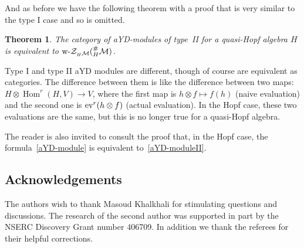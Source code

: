 \documentclass[pdftex]{sigma}
\newcommand{\Zc}{\mathcal{Z}}
\newcommand{\hmod}{{_H\mathcal{M}}}
\newcommand{\hhash}{{^{\#}_H \mathcal{M}}}
\numberwithin{equation}{section}
\newtheorem{Theorem}{Theorem}[section]
\begin{document}
 And as before we have the following theorem with a proof that is very similar to the type I case and so is omitted.

\begin{Theorem}The category of aYD-modules of type~II for a quasi-Hopf algebra $H$ is equivalent to $\text{\rm w-}\Zc_\hmod(\hhash)$.
 \end{Theorem}

\begin{Remark}Type I and type II aYD modules are different, though of course are equivalent as categories. The difference between them is like the difference between two maps: $H \otimes \operatorname{Hom}^r(H,V) \rightarrow V $, where the first map is $ h \otimes f \mapsto f(h)$ (naive evaluation) and the second one is $\text{\rm ev}^r(h\otimes f) $ (actual evaluation). In the Hopf case, these two evaluations are the same, but this is no longer true for a quasi-Hopf algebra.

The reader is also invited to consult the proof \cite[Lemma~2.2]{hks} that, in the Hopf case, the formula~\eqref{aYD-module} is equivalent to~\eqref{aYD-moduleII}.
 \end{Remark}

\subsection*{Acknowledgements}

The authors wish to thank Masoud Khalkhali for stimulating questions and discussions. The research of the second author was supported in part by the NSERC Discovery Grant number 406709. In addition we thank the referees for their helpful corrections.
\end{document}
